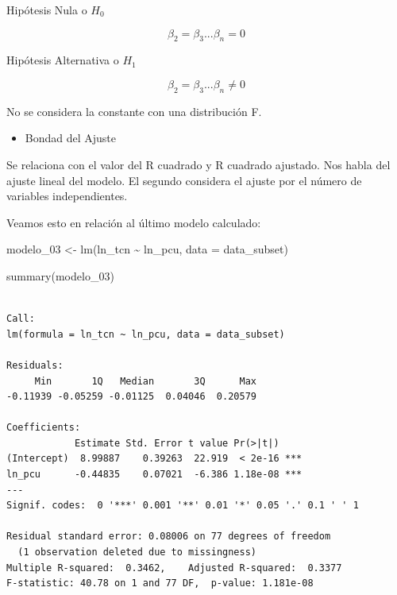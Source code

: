 \documentclass[
  letterpaper,
  DIV=11,
  numbers=noendperiod]{scrartcl}
\newenvironment{Shaded}{\begin{snugshade}}{\end{snugshade}}
\newcommand{\AttributeTok}[1]{\textcolor[rgb]{0.40,0.45,0.13}{#1}}
\newcommand{\FunctionTok}[1]{\textcolor[rgb]{0.28,0.35,0.67}{#1}}
\newcommand{\NormalTok}[1]{\textcolor[rgb]{0.00,0.23,0.31}{#1}}
\newcommand{\OtherTok}[1]{\textcolor[rgb]{0.00,0.23,0.31}{#1}}
\newcommand{\SpecialCharTok}[1]{\textcolor[rgb]{0.37,0.37,0.37}{#1}}
\providecommand{\tightlist}{%
  \setlength{\itemsep}{0pt}\setlength{\parskip}{0pt}}\usepackage{longtable,booktabs,array}
\begin{document}
Hipótesis Nula o \(H_{0}\)

\begin{equation}
\beta_{2} = \beta_{3}...\beta_{n} = 0
\end{equation}

Hipótesis Alternativa o \(H_{1}\)

\begin{equation}
\beta_{2} = \beta_{3}...\beta_{n} \neq 0
\end{equation}

No se considera la constante con una distribución F.

\begin{itemize}
\tightlist
\item
  Bondad del Ajuste
\end{itemize}

Se relaciona con el valor del R cuadrado y R cuadrado ajustado. Nos
habla del ajuste lineal del modelo. El segundo considera el ajuste por
el número de variables independientes.

Veamos esto en relación al último modelo calculado:

\begin{Shaded}
\begin{Highlighting}[]
\NormalTok{modelo\_03 }\OtherTok{\textless{}{-}} \FunctionTok{lm}\NormalTok{(ln\_tcn }\SpecialCharTok{\textasciitilde{}}\NormalTok{ ln\_pcu, }\AttributeTok{data =}\NormalTok{ data\_subset)}

\FunctionTok{summary}\NormalTok{(modelo\_03)}
\end{Highlighting}
\end{Shaded}

\begin{verbatim}

Call:
lm(formula = ln_tcn ~ ln_pcu, data = data_subset)

Residuals:
     Min       1Q   Median       3Q      Max 
-0.11939 -0.05259 -0.01125  0.04046  0.20579 

Coefficients:
            Estimate Std. Error t value Pr(>|t|)    
(Intercept)  8.99887    0.39263  22.919  < 2e-16 ***
ln_pcu      -0.44835    0.07021  -6.386 1.18e-08 ***
---
Signif. codes:  0 '***' 0.001 '**' 0.01 '*' 0.05 '.' 0.1 ' ' 1

Residual standard error: 0.08006 on 77 degrees of freedom
  (1 observation deleted due to missingness)
Multiple R-squared:  0.3462,    Adjusted R-squared:  0.3377 
F-statistic: 40.78 on 1 and 77 DF,  p-value: 1.181e-08
\end{verbatim}
\end{document}
